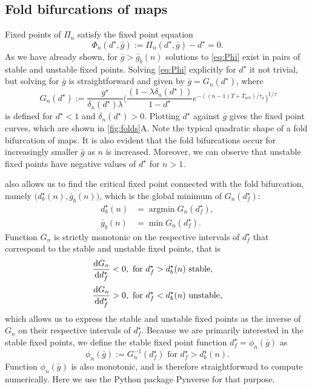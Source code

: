 \subsection{Fold bifurcations of maps}
Fixed points of $\Pi_n$ satisfy the fixed point equation
\begin{equation}
	\label{eq:Phi}
	\Phi_n(d^\star, \bar g) := \Pi_n(d^\star, \bar g)-d^\star = 0.
\end{equation}
As we have already shown, for $\bar g > \bar g_b(n)$ solutions to \cref{eq:Phi} exist in pairs of stable and unstable fixed points.
Solving \cref{eq:Phi} explicitly for $d^\star$ it not trivial, but solving for $\bar g$ is straightforward and given by $\bar g= G_n(d^\star)$, where
\begin{equation}
	~\label{eq:g}
	G_{n}(d^{\star}) :=
	\frac{g^{\star}}{\delta_n(d^\star)\lambda}
	\Big(
	\frac{(1-\lambda\delta_n(d^\star)) }{1-d^\star} e^{-((n-1)T + T_{act})/\tau_a}
	\Big)^{1/\tau}
\end{equation}
is defined for $d^{\star}<1$ and $\delta_{n}(d^{\star})>0$.
Plotting $d^\star$ against $\bar g$ gives the fixed point curves, which are shown in \cref{fig:folds}A.
Note the typical quadratic shape of a fold bifurcation of maps.
It is also evident that the fold bifurcations occur for increasingly smaller $\bar g$ as $n$ is increased.
Moreover, we can observe that unstable fixed points have negative values of $d^\star$ for $n>1$.

 also allows us to find the critical fixed point connected with the fold bifurcation, namely $\big(d^\star_b(n), \bar g_b(n)\big)$, which is the global minimum
of $G_n(d^\star_f)$:
\begin{align}
	d^\star_b(n) & = \operatorname{argmin} G_n(d^\star_f), \\
	\bar g_b(n)  & = \min{G_n(d^\star_f)}.
\end{align}
Function $G_n$ is strictly monotonic on the respective intervals of $d^\star_f$ that correspond to the stable and unstable fixed points, that is
\begin{align}
	\dv{G_n}{d^\star_f} & < 0, \text{ for } d^\star_f>d^\star_b(n) \text{ stable},   \\[0.5ex]
	\dv{G_n}{d^\star_f} & > 0, \text{ for } d^\star_f<d^\star_b(n) \text{ unstable},
\end{align}
which allows us to express the stable and unstable fixed points as the inverse of $G_n$ on their respective intervals of $d^\star_f$.
Because we are primarily interested in the stable fixed points, we define the stable fixed point function $d^\star_f = \phi_n(\bar g)$ as
\begin{equation}
	\label{eq:phi}
	\phi_n(\bar g):= G_n^{-1}(d^\star_f) \text{ for } d^\star_f>d^\star_b(n).
\end{equation}
Function $\phi_n(\bar g)$ is also monotonic, and is therefore straightforward to compute numerically.
Here we use the Python package Pynverse \citep{pynverse} for that purpose.


